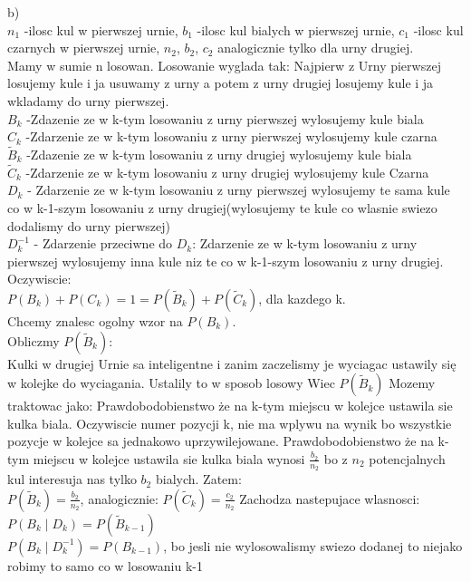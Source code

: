 \documentclass[fleqn]{article}
\begin{document}
b)\\
$n_{1}$ -ilosc kul w pierwszej urnie, $b_{1}$ -ilosc kul bialych w pierwszej urnie, $c_{1}$ -ilosc kul czarnych w pierwszej urnie, $n_{2}$, $b_{2}$, $c_{2}$ 
analogicznie tylko dla urny drugiej.\\
Mamy w sumie n losowan. Losowanie wyglada tak: Najpierw z Urny pierwszej losujemy kule i ja usuwamy z urny a potem z urny drugiej losujemy kule i ja wkladamy do 
urny pierwszej.\\
$B_{k}$ -Zdazenie ze w k-tym losowaniu z urny pierwszej wylosujemy kule biala\\
$C_{k}$ -Zdarzenie ze w k-tym losowaniu z urny pierwszej wylosujemy kule czarna\\
$\tilde{B}_{k}$ -Zdazenie ze w k-tym losowaniu z urny drugiej wylosujemy kule biala\\
$\tilde{C}_{k}$ -Zdarzenie ze w k-tym losowaniu z urny drugiej wylosujemy kule Czarna\\
$D_{k}$ - Zdarzenie ze w k-tym losowaniu z urny pierwszej wylosujemy te sama kule co w k-1-szym losowaniu z urny drugiej(wylosujemy te kule co wlasnie swiezo 
dodalismy do urny pierwszej)\\
$D_{k}^{-1}$ - Zdarzenie przeciwne do $D_{k}$: Zdarzenie ze w k-tym losowaniu z urny pierwszej wylosujemy inna kule niz te co w k-1-szym losowaniu z urny drugiej. 
Oczywiscie:\\$P(B_{k})+P(C_{k})=1=P(\tilde{B}_{k})+P(\tilde{C}_{k})$, dla kazdego k.\\
Chcemy znalesc ogolny wzor na $P(B_{k})$.\\
Obliczmy $P(\tilde{B}_{k})$:\\
Kulki w drugiej Urnie sa inteligentne i zanim zaczelismy je wyciagac ustawily się w kolejke do wyciagania. Ustalily to w sposob losowy Wiec $P(\tilde{B}_{k})$ 
Mozemy traktowac jako: Prawdobodobienstwo że na k-tym miejscu w kolejce ustawila sie kulka biala. Oczywiscie numer pozycji k, nie ma wplywu na wynik bo wszystkie 
pozycje w kolejce sa jednakowo uprzywilejowane. Prawdobodobienstwo że na k-tym miejscu w kolejce ustawila sie kulka biala wynosi $\frac{b_{2}}{n_{2}}$ bo z $n_{2}$ 
potencjalnych kul interesuja nas tylko $b_{2}$ bialych. Zatem:\\
$P(\tilde{B}_{k})=\frac{b_{2}}{n_{2}}$, analogicznie: $P(\tilde{C}_{k})=\frac{c_{2}}{n_{2}}$
Zachodza nastepujace wlasnosci:\\
$P(B_{k}\mid D_{k})=P(\tilde{B}_{k-1})$\\
$P(B_{k}\mid D_{k}^{-1})=P(B_{k-1})$, bo jesli nie wylosowalismy swiezo dodanej to niejako robimy to samo co w losowaniu k-1\\
\end{document}
